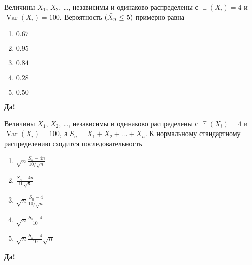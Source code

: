 \documentclass[t]{beamer}
\DeclareMathOperator{\Var}{Var}
\DeclareMathOperator{\E}{\mathbb{E}}
\let\P\relax
\DeclareMathOperator{\P}{\mathbb{P}}
\begin{document}
 \begin{frame} \label{36-Yes} 
\begin{block}{36} 

Величины $X_1$, $X_2$, \ldots, независимы и одинаково распределены с $\E(X_i) = 4$ и $\Var(X_i) = 100$. Вероятность $\P(\bar X_n \leq 5)$ примерно равна
  


 \end{block} 
\begin{enumerate} 
\item[] \hyperlink{36-No}{\beamergotobutton{}  $0.67$ }
\item[] \hyperlink{36-No}{\beamergotobutton{}  $0.95$ }
\item[] \hyperlink{36-Yes}{\beamergotobutton{}  $0.84$ }
\item[] \hyperlink{36-No}{\beamergotobutton{}  $0.28$ }
\item[] \hyperlink{36-No}{\beamergotobutton{}  $0.50$ }
\end{enumerate} 

 \textbf{Да!} 
 \hyperlink{37}{}\end{frame} 


 \begin{frame} \label{37-Yes} 
\begin{block}{37} 

Величины $X_1$, $X_2$, \ldots, независимы и одинаково распределены с $\E(X_i) = 4$ и $\Var(X_i) = 100$, а $S_n = X_1 + X_2 + \ldots + X_n$. К нормальному стандартному распределению сходится последовательность
  


 \end{block} 
\begin{enumerate} 
\item[] \hyperlink{37-No}{\beamergotobutton{}  $\sqrt{n}\frac{S_n - 4n}{10/\sqrt{n}}$}
\item[] \hyperlink{37-Yes}{\beamergotobutton{}  $\frac{S_n - 4n}{10\sqrt{n}}$}
\item[] \hyperlink{37-No}{\beamergotobutton{}  $\sqrt{n}\frac{S_n - 4}{10/\sqrt{n}}$}
\item[] \hyperlink{37-No}{\beamergotobutton{}  $\sqrt{n}\frac{S_n - 4}{10}$}
\item[] \hyperlink{37-No}{\beamergotobutton{}  $\sqrt{n}\frac{S_n - 4}{10}\sqrt{n}$}
\end{enumerate} 

 \textbf{Да!} 
 \hyperlink{38}{}\end{frame} 
\end{document}
